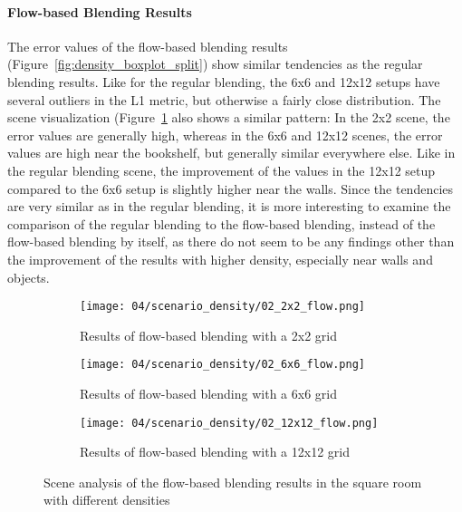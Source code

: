 \paragraph{Flow-based Blending Results}
The error values of the flow-based blending results (Figure~\ref{fig:density_boxplot_split}) show similar tendencies as the regular blending results. Like for the regular blending, the 6x6 and 12x12 setups have several outliers in the L1 metric, but otherwise a fairly close distribution. The scene visualization (Figure~\ref{fig:density_flow_scene_analysis} also shows a similar pattern: In the 2x2 scene, the error values are generally high, whereas in the 6x6 and 12x12 scenes, the error values are high near the bookshelf, but generally similar everywhere else. Like in the regular blending scene, the improvement of the values in the 12x12 setup compared to the 6x6 setup is slightly higher near the walls. Since the tendencies are very similar as in the regular blending, it is more interesting to examine the comparison of the regular blending to the flow-based blending, instead of the flow-based blending by itself, as there do not seem to be any findings other than the improvement of the results with higher density, especially near walls and objects.

\begin{figure}
\centering
    \hfill
    \begin{subfigure}[b]{0.32\textwidth}
            \centering
            \texttt{[image: 04/scenario\_density/02\_2x2\_flow.png]}
            \caption{Results of flow-based blending with a 2x2 grid}
    \end{subfigure}
    \hfill
    \begin{subfigure}[b]{0.32\textwidth}
            \centering
            \texttt{[image: 04/scenario\_density/02\_6x6\_flow.png]}
            \caption{Results of flow-based blending with a 6x6 grid}
    \end{subfigure}
    \hfill
    \begin{subfigure}[b]{0.32\textwidth}
            \centering
            \texttt{[image: 04/scenario\_density/02\_12x12\_flow.png]}
            \caption{Results of flow-based blending with a 12x12 grid}
    \end{subfigure}
    \hfill
  \caption{Scene analysis of the flow-based blending results in the square room with different densities} \label{fig:density_flow_scene_analysis}
\end{figure}


